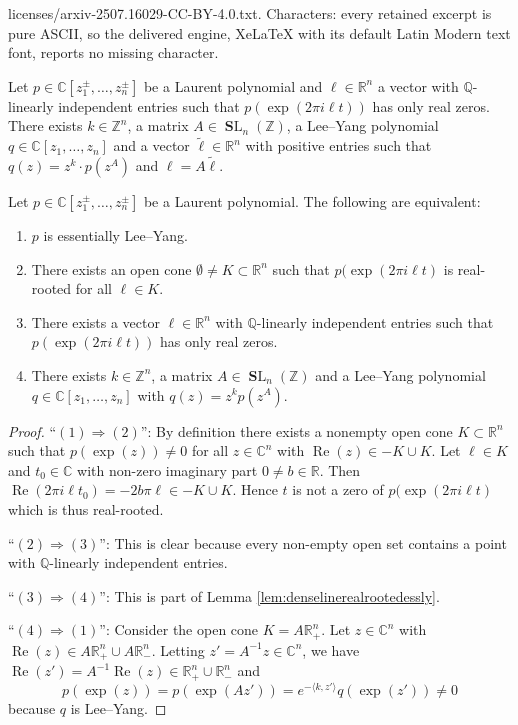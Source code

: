 \documentclass[10pt,a4paper]{amsart}
\newcommand{\C}{{\mathbb C}}
\newcommand{\Q}{{\mathbb Q}}
\newcommand{\Rea}{\operatorname{Re}}
\newcommand{\R}{{\mathbb R}}
\newcommand{\SL}{\operatorname{{\mathbf SL}}}
\newcommand{\Z}{{\mathbb Z}}
\begin{document}
licenses/arxiv-2507.16029-CC-BY-4.0.txt. Characters: every retained excerpt is pure ASCII, so the delivered engine, XeLaTeX with its default Latin Modern text font, reports no missing character.
\begin{lem}\label{lem:denselinerealrootedessly}
    Let $p\in\C[z_1^{\pm},\ldots,z_n^{\pm}]$ be a Laurent polynomial and $\ell\in\R^n$ a vector with $\Q$-linearly independent entries such that $p(\exp(2\pi i\ell t))$ has only real zeros. There exists $k\in\Z^n$, a matrix $A\in\SL_n(\Z)$, a Lee--Yang polynomial $q\in\C[z_1,\ldots,z_n]$ and a vector $\tilde\ell\in\R^n$ with positive entries such that $q(z)=z^k\cdot p(z^A)$ and $\ell=A\tilde\ell$.
\end{lem}

\begin{thm}\label{thm:essleeyangchara}
    Let $p\in\C[z_1^{\pm},\ldots,z_n^{\pm}]$ be a Laurent polynomial. The following are equivalent:
    \begin{enumerate}
        \item $p$ is essentially Lee--Yang.
        \item There exists an open cone $\emptyset\neq K\subset\R^n$ such that $p(\exp(2\pi i\ell t)$ is real-rooted for all $\ell\in K$.
        \item There exists a vector $\ell\in\R^n$ with $\Q$-linearly independent entries such that $p(\exp(2\pi i\ell t))$ has only real zeros.
        \item There exists $k\in\Z^n$, a matrix $A\in\SL_n(\Z)$ and a Lee--Yang polynomial $q\in\C[z_1,\ldots,z_n]$ with $q(z)=z^kp(z^A)$.
    \end{enumerate}
\end{thm}

\begin{proof}
    ``$(1)\Rightarrow(2)$'': By definition there exists a nonempty open cone $K\subset\R^n$ such that $p(\exp(z))\neq0$ for all $z\in\C^n$ with $\Rea(z)\in -K\cup K$. Let $\ell\in K$ and $t_0\in\C$ with non-zero imaginary part $0\neq b\in\R$. Then $\Rea(2\pi i\ell t_0)=-2b\pi \ell\in -K\cup K$. Hence $t$ is not a zero of $p(\exp(2\pi i\ell t)$ which is thus real-rooted.

    ``$(2)\Rightarrow(3)$'': This is clear because every non-empty open set contains a point with $\Q$-linearly independent entries.

    ``$(3)\Rightarrow(4)$'': This is part of Lemma \ref{lem:denselinerealrootedessly}.

    ``$(4)\Rightarrow(1)$'':  Consider the open cone $K=A\R_{+
    }^n$. Let $z\in\C^n$ with $\Rea(z)\in A\R_{+
    }^n\cup A\R_{-
    }^n$. Letting $z'=A^{-1}z\in\C^n$, we have $\Rea(z')=A^{-1}\Rea(z)\in \R_{+
    }^n\cup \R_{-
    }^n$ and
    \begin{equation*}
        p(\exp(z))=p(\exp(Az'))=e^{-\langle  k,z'\rangle}q(\exp(z'))\neq0
    \end{equation*}
    because $q$ is Lee--Yang.
\end{proof}
\end{document}
